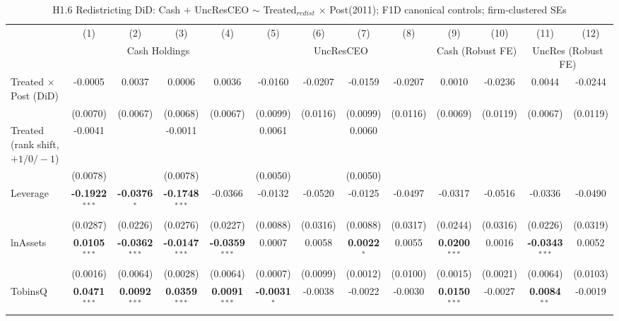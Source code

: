 \begin{landscape}
\begin{table}[H]
\setlength{\tabcolsep}{3pt}
\renewcommand{\arraystretch}{0.85}
\centering
\caption{H1.6 Redistricting DiD: Cash $+$ UncResCEO $\sim$ Treated$_{redist}$ $\times$ Post(2011); F1D canonical controls; firm-clustered SEs}
\label{tab:h1_6_redistricting_did}
\scriptsize
\begin{tabular}{lcccccccccccc}
\toprule
 & (1) & (2) & (3) & (4) & (5) & (6) & (7) & (8) & (9) & (10) & (11) & (12) \\
 & \multicolumn{4}{c}{Cash Holdings} & \multicolumn{4}{c}{UncResCEO} & \multicolumn{2}{c}{Cash (Robust FE)} & \multicolumn{2}{c}{UncRes (Robust FE)} \\
\cmidrule(lr){2-5} \cmidrule(lr){6-9} \cmidrule(lr){10-11} \cmidrule(lr){12-13}
\midrule
Treated $\times$ Post (DiD) & -0.0005 & 0.0037 & 0.0006 & 0.0036 & -0.0160 & -0.0207 & -0.0159 & -0.0207 & 0.0010 & -0.0236 & 0.0044 & -0.0244 \\
 & (0.0070) & (0.0067) & (0.0068) & (0.0067) & (0.0099) & (0.0116) & (0.0099) & (0.0116) & (0.0069) & (0.0119) & (0.0067) & (0.0119) \\
Treated (rank shift, $+1/0/-1$) & -0.0041 &  & -0.0011 &  & 0.0061 &  & 0.0060 &  &  &  &  &  \\
 & (0.0078) &  & (0.0078) &  & (0.0050) &  & (0.0050) &  &  &  &  &  \\
\midrule
Leverage & \textbf{-0.1922}$^{***}$ & \textbf{-0.0376}$^{*}$ & \textbf{-0.1748}$^{***}$ & -0.0366 & -0.0132 & -0.0520 & -0.0125 & -0.0497 & -0.0317 & -0.0516 & -0.0336 & -0.0490 \\
 & (0.0287) & (0.0226) & (0.0276) & (0.0227) & (0.0088) & (0.0316) & (0.0088) & (0.0317) & (0.0244) & (0.0316) & (0.0226) & (0.0319) \\
lnAssets & \textbf{0.0105}$^{***}$ & \textbf{-0.0362}$^{***}$ & \textbf{-0.0147}$^{***}$ & \textbf{-0.0359}$^{***}$ & 0.0007 & 0.0058 & \textbf{0.0022}$^{*}$ & 0.0055 & \textbf{0.0200}$^{***}$ & 0.0016 & \textbf{-0.0343}$^{***}$ & 0.0052 \\
 & (0.0016) & (0.0064) & (0.0028) & (0.0064) & (0.0007) & (0.0099) & (0.0012) & (0.0100) & (0.0015) & (0.0021) & (0.0064) & (0.0103) \\
TobinsQ & \textbf{0.0471}$^{***}$ & \textbf{0.0092}$^{***}$ & \textbf{0.0359}$^{***}$ & \textbf{0.0091}$^{***}$ & \textbf{-0.0031}$^{*}$ & -0.0038 & -0.0022 & -0.0030 & \textbf{0.0150}$^{***}$ & -0.0027 & \textbf{0.0084}$^{**}$ & -0.0019 \\

\end{tabular}
\end{table}
\end{landscape}
